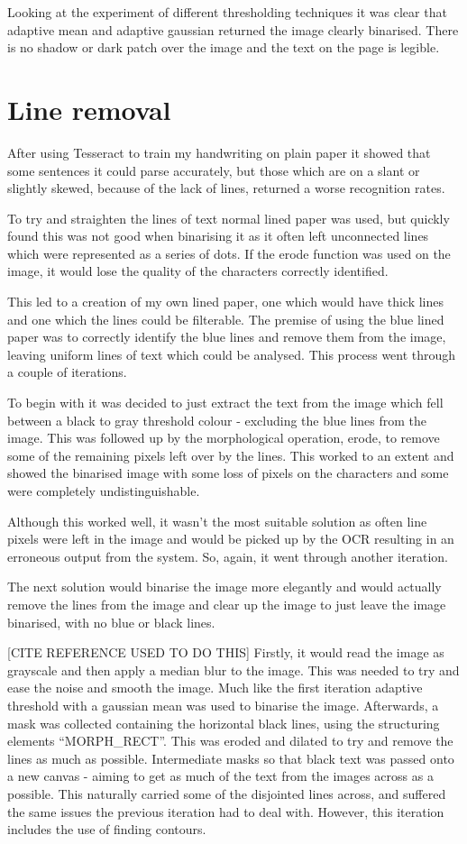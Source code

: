 Looking at the experiment of different thresholding techniques it was clear that adaptive mean and adaptive gaussian returned the image clearly binarised. There is no shadow or dark patch over the image and the text on the page is legible.

\section{Line removal}
After using Tesseract to train my handwriting on plain paper it showed that some sentences it could parse accurately, but those which are on a slant or slightly skewed, because of the lack of lines, returned a worse recognition rates.

To try and straighten the lines of text normal lined paper was used, but quickly found this was not good when binarising it as it often left unconnected lines which were represented as a series of dots. If the erode function was used on the image, it would lose the quality of the characters correctly identified.

This led to a creation of my own lined paper, one which would have thick lines and one which the lines could be filterable. The premise of using the blue lined paper was to correctly identify the blue lines and remove them from the image, leaving uniform lines of text which could be analysed. This process went through a couple of iterations.

To begin with it was decided to just extract the text from the image which fell between a black to gray threshold colour - excluding the blue lines from the image. This was followed up by the morphological operation, erode, to remove some of the remaining pixels left over by the lines. This worked to an extent and showed the binarised image with some loss of pixels on the characters and some were completely undistinguishable.

Although this worked well, it wasn't the most suitable solution as often line pixels were left in the image and would be picked up by the OCR resulting in an erroneous output from the system. So, again, it went through another iteration.

The next solution would binarise the image more elegantly and would actually remove the lines from the image and clear up the image to just leave the image binarised, with no blue or black lines.

[CITE REFERENCE USED TO DO THIS]
Firstly, it would read the image as grayscale and then apply a median blur to the image. This was needed to try and ease the noise and smooth the image. Much like the first iteration adaptive threshold with a gaussian mean was used to binarise the image. Afterwards, a mask was collected containing the horizontal black lines, using the structuring elements ``MORPH\_RECT''. This was eroded and dilated to try and remove the lines as much as possible. Intermediate masks so that black text was passed onto a new canvas - aiming to get as much of the text from the images across as a possible. This naturally carried some of the disjointed lines across, and suffered the same issues the previous iteration had to deal with. However, this iteration includes the use of finding contours.


